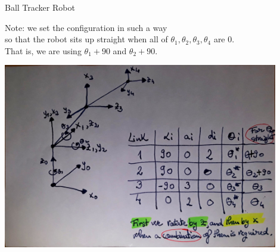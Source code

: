 \documentclass{article}
\begin{document}
	
\begin{center}
	{\Large Ball Tracker Robot}
\end{center}

\begin{center}
	{\large Note: we set the configuration in such a way \\
		so that the robot sits up straight when all of $\theta_{1}, \theta_{2}, \theta_{3}, \theta_{4}$ are 0. \\ That is, we are using $\theta_{1}+90$ and $ \theta_{2}+90$.}
\end{center}

\begin{center}
	\includegraphics[width=0.9\textwidth]{Configuration}
\end{center}

\newpage
\end{document}
